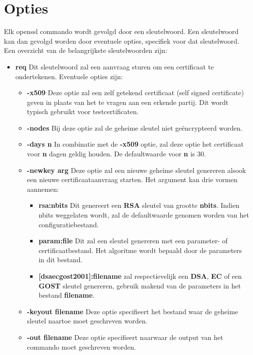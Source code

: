 \documentclass{report}
\begin{document}
	\section{Opties}
	Elk openssl commando wordt gevolgd door een sleutelwoord. Een sleutelwoord kan dan gevolgd worden door eventuele opties, specifiek voor dat sleutelwoord. Een overzicht van de belangrijkste sleutelwoorden zijn:
	\begin{itemize}
		\item \textbf{req\qquad} Dit sleutelwoord zal een aanvraag sturen om een certificaat te ondertekenen. Eventuele opties zijn:
			\begin{itemize}
				\item[] \textbf{-x509} Deze optie zal een zelf getekend certificaat (self signed certificate) geven in plaats van het te vragen aan een erkende partij. Dit wordt typisch gebruikt voor testcertificaten. 
				\item[] \textbf{-nodes} Bij deze optie zal de geheime sleutel niet geëncrypteerd worden.
				\item[] \textbf{-days n} In combinatie met de \textbf{-x509} optie, zal deze optie het certificaat voor \textbf{n} dagen geldig houden. De defaultwaarde voor \textbf{n} is 30.
				\item[] \textbf{-newkey arg} Deze optie zal een nieuwe geheime sleutel genereren alsook een nieuwe certificaataanvraag starten. Het argument kan drie vormen aannemen:
				\begin{itemize}
					\item \textbf{rsa:nbits} Dit genereert een \textbf{RSA} sleutel van grootte \textbf{nbits}. Indien nbits weggelaten wordt, zal de defaultwaarde genomen worden van het configuratiebestand.
					\item \textbf{param:file} Dit zal een sleutel genereren met een parameter- of certificaatbestand. Het algoritme wordt bepaald door de parameters in dit bestand.
					\item \textbf{[dsa\textbar ec\textbar gost2001]:filename} zal respectievelijk een \textbf{DSA}, \textbf{EC} of een \textbf{GOST} sleutel genereren, gebruik makend van de parameters in het bestand \textbf{filename}. 
				\end{itemize}
				\item[] \textbf{-keyout filename} Deze optie specifieert het bestand waar de geheime sleutel naartoe moet geschreven worden. 
				\item[] \textbf{-out filename} Deze optie specifieert naarwaar de output van het commando moet geschreven worden.

\end{itemize}
\end{itemize}
\end{document}
